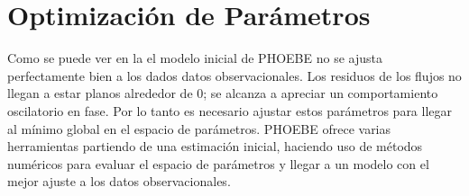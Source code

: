 \section{Optimización de Parámetros}

Como se puede ver en la  el modelo inicial
de PHOEBE no se ajusta perfectamente bien a los dados datos observacionales. Los
residuos de los flujos no llegan a estar planos alrededor de 0; se alcanza a
apreciar un comportamiento oscilatorio en fase. Por lo tanto es necesario
ajustar estos parámetros para llegar al mínimo global en el espacio de
parámetros. PHOEBE ofrece varias herramientas partiendo de una estimación
inicial, haciendo uso de métodos numéricos para evaluar el espacio de parámetros
y llegar a un modelo con el mejor ajuste a los datos observacionales. 